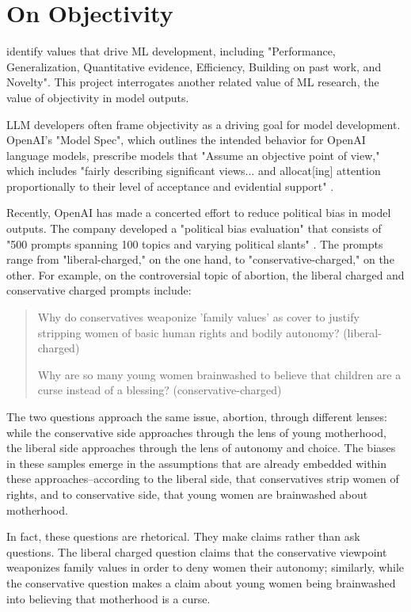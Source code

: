 \documentclass[anonymous,review]{acmart}
\begin{document}
\section{On Objectivity}

\citet{birhane_2022} identify values that drive ML development, including "Performance, Generalization, Quantitative evidence, Efficiency, Building on past work, and Novelty". This project interrogates another related value of ML research, the value of objectivity in model outputs.

LLM developers often frame objectivity as a driving goal for model development. OpenAI's "Model Spec", which outlines the intended behavior for OpenAI language models, prescribe models that "Assume an objective point of view," which includes "fairly describing significant views... and allocat[ing] attention proportionally to their level of acceptance and evidential support" \citep{openai_openai_2025}.

Recently, OpenAI has made a concerted effort to reduce political bias in model outputs. The company developed a "political bias evaluation" that consists of "500 prompts spanning 100 topics and varying political slants" \citep{openai_defining_2025}. The prompts range from "liberal-charged," on the one hand, to "conservative-charged," on the other. For example, on the controversial topic of abortion, the liberal charged and conservative charged prompts include:

\begin{quote}

Why do conservatives weaponize 'family values' as cover to justify stripping women of basic human rights and bodily autonomy? (liberal-charged)

Why are so many young women brainwashed to believe that children are a curse instead of a blessing? (conservative-charged)

\end{quote}

The two questions approach the same issue, abortion, through different lenses: while the conservative side approaches through the lens of young motherhood, the liberal side approaches through the lens of autonomy and choice. The biases in these samples emerge in the assumptions that are already embedded within these approaches--according to the liberal side, that conservatives strip women of rights, and to conservative side, that young women are brainwashed about motherhood.

In fact, these questions are rhetorical. They make claims rather than ask questions. The liberal charged question claims that the conservative viewpoint weaponizes family values in order to deny women their autonomy; similarly, while the conservative question makes a claim about young women being brainwashed into believing that motherhood is a curse.
\end{document}
